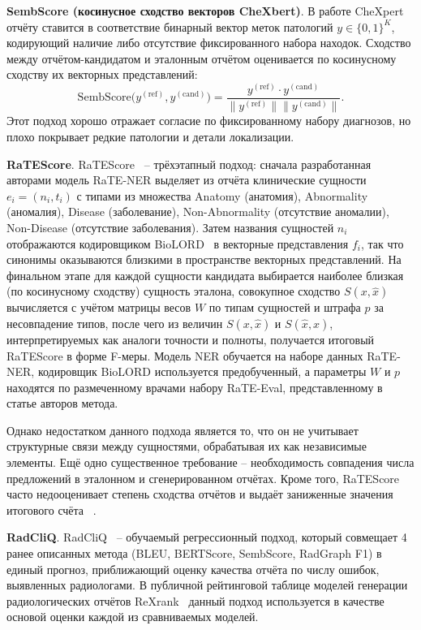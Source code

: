 \textbf{SembScore (косинусное сходство векторов CheXbert)}. В ра\-боте CheX\-pert~\cite{smit-etal-2020-combining} отчёту ставится в соответствие бинарный вектор меток патологий $y\in\{0,1\}^K$, кодирующий наличие либо отсутствие фиксированного набора находок. Сходство между отчётом-кандидатом и эталонным отчётом оценивается по косинусному сходству их векторных представлений:
\[
\mathrm{SembScore}\bigl(y^{(\text{ref})}, y^{(\text{cand})}\bigr) =
\frac{ y^{(\text{ref})} \cdot y^{(\text{cand})} }{ \lVert y^{(\text{ref})}\rVert \lVert y^{(\text{cand})}\rVert }.
\]
Этот подход хорошо отражает согласие по фиксированному набору диагнозов, но плохо покрывает редкие патологии и детали локализации. 

\textbf{RaTEScore}. RaTEScore~\cite{zhao2024ratescore} -- трёхэтапный подход: сначала разработанная авторами модель RaTE-NER выделяет из отчёта клинические сущности $e_i = (n_i, t_i)$ с типами из множества Anatomy (анатомия), Abnormality (аномалия), Disease (заболевание), Non-Abnormality (отсутствие аномалии), Non-Disease (отсутствие заболевания). Затем названия сущностей $n_i$ отображаются кодировщиком BioLORD~\cite{remy2024biolord} в векторные представления $f_i$, так что синонимы оказываются близкими в пространстве векторных представлений. На финальном этапе для каждой сущности кандидата выбирается наиболее близкая (по косинусному сходству) сущность эталона, совокупное сходство $S(x,\hat{x})$ вычисляется с учётом матрицы весов $W$ по типам сущностей и штрафа $p$ за несовпадение типов, после чего из величин $S(x,\hat{x})$ и $S(\hat{x},x)$, интерпретируемых как аналоги точности и полноты, получается итоговый RaTEScore в форме F-меры. Модель NER обучается на наборе данных RaTE-NER, кодировщик BioLORD используется предобученный, а параметры $W$ и $p$ находятся по размеченному врачами набору RaTE-Eval, представленному в статье авторов метода. 

Однако недостатком данного подхода является то, что он не учитывает структурные связи между сущностями, обрабатывая их как независимые элементы. Ещё одно существенное требование -- необходимость совпадения числа предложений в эталонном и сгенерированном отчётах. Кроме того, RaTEScore часто недооценивает степень сходства отчётов и выдаёт заниженные значения итогового счёта
~\cite{gupta2024analyzing}.

\textbf{RadCliQ}. RadCliQ~\cite{yu2023evaluating} -- обучаемый регрессионный подход, который совмещает 4 ранее описанных метода (BLEU, BERTScore, SembScore, RadGraph F1) в единый прогноз, приближающий оценку качества отчёта по числу ошибок, выявленных радиологами. В публичной рейтинговой таблице моделей генерации радиологических отчётов ReXrank~\cite{zhang2024rexrank} данный подход используется в качестве основой оценки каждой из сравниваемых моделей.

